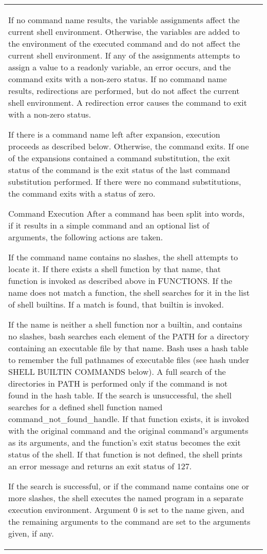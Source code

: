 \documentclass[11pt]{article}
\begin{document}
\begin{longtable}{p{}p{}}
{{{If no command name results, the variable assignments affect the current shell environment. Otherwise, the variables are added to the environment of the executed command and do not affect the current shell environment. If any of the assignments attempts to assign a value to a readonly variable, an error occurs, and the command exits with a non-zero status.
If no command name results, redirections are performed, but do not affect the current shell environment. A redirection error causes the command to exit with a non-zero status.

If there is a command name left after expansion, execution proceeds as described below. Otherwise, the command exits. If one of the expansions contained a command substitution, the exit status of the command is the exit status of the last command substitution performed. If there were no command substitutions, the command exits with a status of zero.

Command Execution
After a command has been split into words, if it results in a simple command and an optional list of arguments, the following actions are taken.

If the command name contains no slashes, the shell attempts to locate it. If there exists a shell function by that name, that function is invoked as described above in FUNCTIONS. If the name does not match a function, the shell searches for it in the list of shell builtins. If a match is found, that builtin is invoked.

If the name is neither a shell function nor a builtin, and contains no slashes, bash searches each element of the PATH for a directory containing an executable file by that name. Bash uses a hash table to remember the full pathnames of executable files (see hash under SHELL BUILTIN COMMANDS below). A full search of the directories in PATH is performed only if the command is not found in the hash table. If the search is unsuccessful, the shell searches for a defined shell function named command_not_found_handle. If that function exists, it is invoked with the original command and the original command's arguments as its arguments, and the function's exit status becomes the exit status of the shell. If that function is not defined, the shell prints an error message and returns an exit status of 127.

If the search is successful, or if the command name contains one or more slashes, the shell executes the named program in a separate execution environment. Argument 0 is set to the name given, and the remaining arguments to the command are set to the arguments given, if any.

}}}
\end{longtable}
\end{document}
